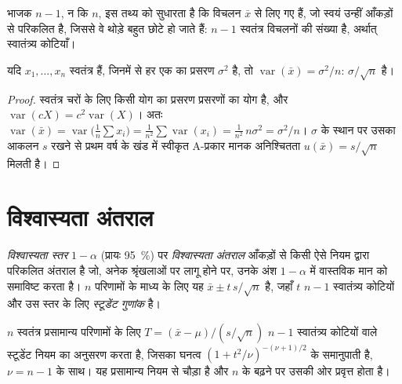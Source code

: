 भाजक $n - 1$, न कि $n$, इस तथ्य को सुधारता है कि विचलन $\bar x$ से लिए गए हैं,
जो स्वयं उन्हीं आँकड़ों से परिकलित है, जिससे वे थोड़े बहुत छोटे हो जाते हैं: $n - 1$
स्वतंत्र विचलनों की संख्या है, अर्थात् स्वातंत्र्य कोटियाँ।

\begin{theorem}[माध्य का प्रसरण]\label{thm:b2:measurement-statistics:mean-variance}
यदि $x_1, \dots, x_n$ स्वतंत्र हैं, जिनमें से हर एक का प्रसरण $\sigma^2$ है, तो $\operatorname{var}(\bar x) =
\sigma^2/n$:  $\sigma/\sqrt n$ है।
\end{theorem}

\begin{proof}
स्वतंत्र चरों के लिए किसी योग का प्रसरण प्रसरणों का योग है, और
$\operatorname{var}(cX) = c^2\operatorname{var}(X)$। अतः $\operatorname{var}(\bar x) =
\operatorname{var}\bigl(\tfrac1n\sum x_i\bigr) = \tfrac{1}{n^2}\sum\operatorname{var}(x_i) =
\tfrac{1}{n^2}\,n\sigma^2 = \sigma^2/n$। $\sigma$ के स्थान पर उसका आकलन $s$ रखने से प्रथम वर्ष के खंड में स्वीकृत
A-प्रकार मानक अनिश्चितता $u(\bar x) = s/\sqrt n$ मिलती है।
\end{proof}

\section{विश्वास्यता अंतराल}

\begin{definition}[विश्वास्यता अंतराल]\label{def:b2:measurement-statistics:confidence}
\emph{विश्वास्यता स्तर}
$1 - \alpha$ (प्रायः 95~\%) पर \emph{विश्वास्यता अंतराल} आँकड़ों से किसी ऐसे नियम द्वारा परिकलित अंतराल है जो,
अनेक श्रृंखलाओं पर लागू होने पर, उनके अंश $1 - \alpha$ में वास्तविक मान को समाविष्ट करता है। $n$ परिणामों के माध्य के लिए यह
$\bar x \pm t\,s/\sqrt n$ है, जहाँ $t$ $n - 1$ स्वातंत्र्य कोटियों और उस स्तर के लिए
\emph{स्टूडेंट गुणांक} है।
\end{definition}

\begin{proposition}[स्टूडेंट नियम]\label{prop:b2:measurement-statistics:student}
$n$ स्वतंत्र प्रसामान्य परिणामों के लिए $T = (\bar x - \mu)/(s/\sqrt n)$
$n - 1$ स्वातंत्र्य कोटियों वाले स्टूडेंट नियम का अनुसरण करता है, जिसका घनत्व $(1 + t^2/\nu)^{-(\nu+1)/2}$ के समानुपाती है,
$\nu = n - 1$ के साथ। यह प्रसामान्य नियम से चौड़ा है और $n$ के बढ़ने पर उसकी ओर प्रवृत्त होता है।
\end{proposition}

